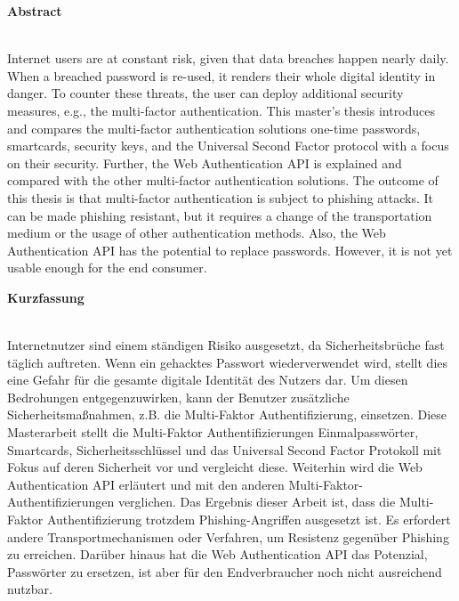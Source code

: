 \thispagestyle{noheader}
\setlength{\columnsep}{1cm}

{}

\begin{large}
	\textbf{Abstract} \\ \\
\end{large}
Internet users are at constant risk, given that data breaches happen nearly daily. When a breached password is re-used, it renders their whole digital identity in danger. To counter these threats, the user can deploy additional security measures, e.g., the multi-factor authentication. This master's thesis introduces and compares the multi-factor authentication solutions one-time passwords, smartcards, security keys, and the Universal Second Factor protocol with a focus on their security. Further, the Web Authentication API is explained and compared with the other multi-factor authentication solutions. The outcome of this thesis is that multi-factor authentication is subject to phishing attacks. It can be made phishing resistant, but it requires a change of the transportation medium or the usage of other authentication methods. Also, the Web Authentication API has the potential to replace passwords. However, it is not yet usable enough for the end consumer.


\addvspace{0.7cm}

\begin{large}
	\textbf{Kurzfassung} \\ \\
\end{large}
Internetnutzer sind einem ständigen Risiko ausgesetzt, da Sicherheitsbrüche fast täglich auftreten. Wenn ein gehacktes Passwort wiederverwendet wird, stellt dies eine Gefahr für die gesamte digitale Identität des Nutzers dar. Um diesen Bedrohungen entgegenzuwirken, kann der Benutzer zusätzliche Sicherheitsmaßnahmen, z.B. die Multi-Faktor Authentifizierung, einsetzen. Diese Masterarbeit stellt die Multi-Faktor Authentifizierungen Einmalpasswörter, Smartcards, Sicherheitsschlüssel und das Universal Second Factor Protokoll mit Fokus auf deren Sicherheit vor und vergleicht diese. Weiterhin wird die Web Authentication API erläutert und mit den anderen Multi-Faktor-Authentifizierungen verglichen. Das Ergebnis dieser Arbeit ist, dass die Multi-Faktor Authentifizierung trotzdem Phishing-Angriffen ausgesetzt ist. Es erfordert andere Transportmechanismen oder Verfahren, um Resistenz gegenüber Phishing zu erreichen. Darüber hinaus hat die Web Authentication API das Potenzial, Passwörter zu ersetzen, ist aber für den Endverbraucher noch nicht ausreichend nutzbar.


\newpage